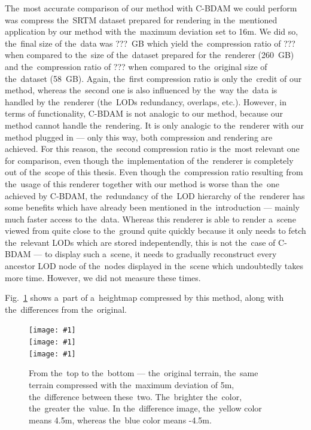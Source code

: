 The~most accurate comparison of our method with C-BDAM we could perform was compress the~SRTM dataset prepared for rendering in the~mentioned application by our method with the~maximum deviation set to 16m. We did so, the~final size of the~data was ???~GB which yield the~compression ratio of ??? when compared to the~size of the~dataset prepared for the~renderer (260~GB) and the~compression ratio of ??? when compared to the~original size of the~dataset (58~GB). Again, the~first compression ratio is only the~credit of our method, whereas the~second one is also influenced by the~way the~data is handled by the~renderer (the~LODs redundancy, overlaps, etc.). However, in terms of functionality, C-BDAM is not analogic to our method, because our method cannot handle the~rendering. It is only analogic to the~renderer with our method plugged in --- only this way, both compression and rendering are achieved. For this reason, the~second compression ratio is the~most relevant one for comparison, even though the~implementation of the~renderer is completely out of the~scope of this thesis. Even though the~compression ratio resulting from the~usage of this renderer together with our method is worse than the~one achieved by C-BDAM, the~redundancy of the~LOD hierarchy of the~renderer has some benefits which have already been mentioned in the~introduction --- mainly much faster access to the~data. Whereas this renderer is able to render a~scene viewed from quite close to the~ground quite quickly because it only needs to fetch the~relevant LODs which are stored indepentendly, this is not the~case of C-BDAM --- to display such a~scene, it needs to gradually reconstruct every ancestor LOD node of the~nodes displayed in the~scene which undoubtedly takes more time. However, we did not measure these times. 

Fig.~\ref{fig:result_samples} shows a~part of a~heightmap compressed by this method, along with the~differences from the~original.

\newcommand{\hspaceimg}{\hspace{0.05cm}}
\newcommand{\vspaceimg}{\vspace{0.15cm}}
\newcommand{\incexamplsolo}[1]{\texttt{[image: \#1]}}

\begin{figure}
	\begin{center}
	\incexamplsolo{figures/samp_orig.png} \\ \vspaceimg
	\incexamplsolo{figures/samp_comp.png} \\ \vspaceimg
	\incexamplsolo{figures/samp_diff.png}
	\end{center}
	\caption{From the~top to the~bottom --- the~original terrain, the~same terrain compressed with the~maximum deviation of 5m, the~difference between these~two. The~brighter the~color, the~greater the~value. In the~difference image, the~yellow color means 4.5m, whereas the~blue color means -4.5m.}
	\label{fig:result_samples}
\end{figure}

